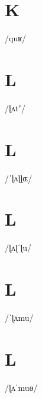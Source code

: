 \documentclass[10pt,a4paper,twoside]{book}
\begin{document}
\section*{K}

\begin{multicols}{3}
 {/quʁ/} {}
\end{multicols}

\section*{L}

\begin{multicols}{3}
 {/ɭʌtʼ/} {}
\end{multicols}

\section*{L}

\begin{multicols}{3}
 {/ˈɭʌɭɭɶ/} {}
\end{multicols}

\section*{L}

\begin{multicols}{3}
 {/ɭʌɭˈɭu/} {}
\end{multicols}

\section*{L}

\begin{multicols}{3}
 {/ˈɭʌmu/} {}
\end{multicols}

\section*{L}

\begin{multicols}{3}
 {/ɭʌˈmuɵ/} {}
\end{multicols}
\end{document}
